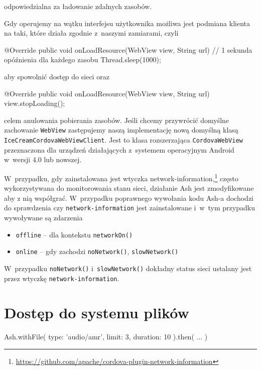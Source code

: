 \documentclass[brudnopis]{xmgr}
\begin{document}
\noindent odpowiedzialna za ładowanie zdalnych zasobów.

Gdy operujemy na wątku interfejsu użytkownika możliwa jest podmiana klienta na taki, które działa zgodnie z~naszymi zamiarami, czyli 

\begin{javacode}
   @Override
   public void onLoadResource(WebView view, String url) {
       // 1 sekunda opóźnienia dla każdego zasobu
       Thread.sleep(1000); 
   }
\end{javacode}

\noindent aby spowolnić dostęp do sieci oraz

\begin{javacode}
   @Override
   public void onLoadResource(WebView view, String url) {
       view.stopLoading();
   }
\end{javacode}

\noindent celem anulowania pobierania zasobów. Jeśli chcemy przywrócić domyślne zachowanie \texttt{WebView} zastępujemy naszą implementację nową domyślną klasą \texttt{IceCreamCordovaWebViewClient}. Jest to klasa rozszerzająca \texttt{CordovaWebView} przeznaczona dla urządzeń działających z~systemem operacyjnym Android w~wersji 4.0 lub nowszej.

W~przypadku, gdy zainstalowana jest wtyczka network-information,\footnote{ \url{https://github.com/apache/cordova-plugin-network-information} } często wykorzystywana do monitorowania stanu sieci, działanie Ash jest zmodyfikowane aby z nią współgrać. W~przypadku poprawnego wywołania kodu Ash-a dochodzi do sprawdzenia czy \texttt{network-information} jest zainstalowane i~w~tym przypadku wywoływane są zdarzenia

\begin{itemize}
  \item \texttt{offline} -- dla kontekstu \texttt{networkOn()} 
  \item \texttt{online} -- gdy zachodzi \texttt{noNetwork()}, \texttt{slowNetwork()}
\end{itemize}

W~przypadku \texttt{noNetwork()} i~\texttt{slowNetwork()} dokładny status sieci ustalany jest przez wtyczkę \texttt{network-information}.

\section{Dostęp do systemu plików}

\begin{javascriptcode}
Ash.withFile({ 
    type: 'audio/amr', 
    limit: 3, 
    duration: 10
 }).then( ... )
\end{javascriptcode}
\end{document}
